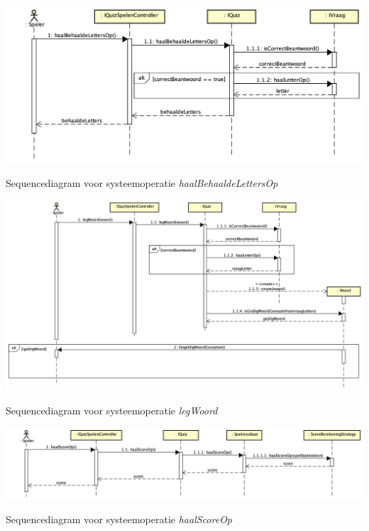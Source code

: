 \begin{mpfigure}
    \includegraphics[width=\linewidth]{../Afbeeldingen/Sequence diagrammen/haalBehaaldeLettersOp.png}
    \caption{Sequencediagram voor systeemoperatie \textit{haalBehaaldeLettersOp}}
    \label{fig:haalbehaaldelettersop}
\end{mpfigure}

\begin{mpfigure}
    \includegraphics[width=\linewidth]{../Afbeeldingen/Sequence diagrammen/legWoord.png}
    \caption{Sequencediagram voor systeemoperatie \textit{legWoord}}
    \label{fig:legwoord}
\end{mpfigure}

\begin{mpfigure}
    \includegraphics[width=\linewidth]{../Afbeeldingen/Sequence diagrammen/haalScoreOp.png}
    \caption{Sequencediagram voor systeemoperatie \textit{haalScoreOp}}
    \label{fig:haalscoreop}
\end{mpfigure}

